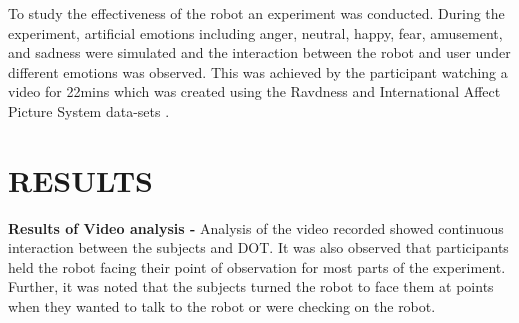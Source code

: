\documentclass[letterpaper, 10 pt, conference]{ieeeconf}  %
\begin{document}
To study the effectiveness of the robot an experiment was conducted. During
the experiment, artificial emotions including anger, neutral, happy, fear, amusement, and sadness were simulated and the interaction between the robot and user under different emotions was observed. This was achieved by the participant watching a video for 22mins which was created using the Ravdness and International Affect Picture System data-sets \cite{d1}. 





\section{RESULTS}
\textbf{Results of Video analysis -}
Analysis of the video recorded showed continuous interaction between the subjects and DOT. It was also observed that participants held the robot facing their point of observation for most parts of the experiment. Further, it was noted that the subjects turned the robot to face them at points when they wanted to talk to the robot or were checking on the robot. 
\end{document}
